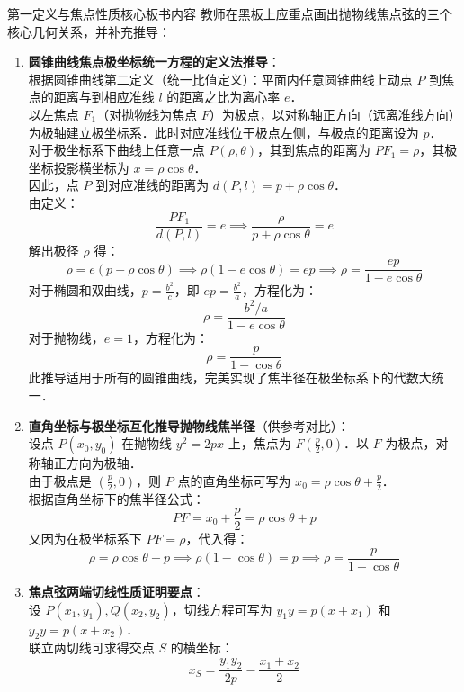 \documentclass[11pt,a4paper]{ctexart}
\begin{document}
\begin{teachbox}{第一定义与焦点性质核心板书内容}
教师在黑板上应重点画出抛物线焦点弦的三个核心几何关系，并补充推导：
\begin{enumerate}
  \item \textbf{圆锥曲线焦点极坐标统一方程的定义法推导}：\\
        根据圆锥曲线第二定义（统一比值定义）：平面内任意圆锥曲线上动点 $P$ 到焦点的距离与到相应准线 $l$ 的距离之比为离心率 $e$．\\
        以左焦点 $F_1$（对抛物线为焦点 $F$）为极点，以对称轴正方向（远离准线方向）为极轴建立极坐标系．此时对应准线位于极点左侧，与极点的距离设为 $p$．\\
        对于极坐标系下曲线上任意一点 $P(\rho, \theta)$，其到焦点的距离为 $PF_1 = \rho$，其极坐标投影横坐标为 $x = \rho\cos\theta$．\\
        因此，点 $P$ 到对应准线的距离为 $d(P,l) = p + \rho\cos\theta$．\\
        由定义：
        \[ \frac{PF_1}{d(P,l)} = e \implies \frac{\rho}{p + \rho\cos\theta} = e \]
        解出极径 $\rho$ 得：
        \[ \rho = e(p + \rho\cos\theta) \implies \rho(1 - e\cos\theta) = ep \implies \rho = \frac{ep}{1-e\cos\theta} \]
        对于椭圆和双曲线，$p = \frac{b^2}{c}$，即 $ep = \frac{b^2}{a}$，方程化为：
        \[ \rho = \frac{b^2/a}{1-e\cos\theta} \]
        对于抛物线，$e=1$，方程化为：
        \[ \rho = \frac{p}{1-\cos\theta} \]
        此推导适用于所有的圆锥曲线，完美实现了焦半径在极坐标系下的代数大统一．
  \item \textbf{直角坐标与极坐标互化推导抛物线焦半径}（供参考对比）：\\
        设点 $P(x_0,y_0)$ 在抛物线 $y^2=2px$ 上，焦点为 $F(\frac{p}{2},0)$．以 $F$ 为极点，对称轴正方向为极轴．\\
        由于极点是 $(\frac{p}{2},0)$，则 $P$ 点的直角坐标可写为 $x_0 = \rho\cos\theta + \frac{p}{2}$．\\
        根据直角坐标下的焦半径公式：
        \[ PF = x_0 + \frac{p}{2} = \rho\cos\theta + p \]
        又因为在极坐标系下 $PF = \rho$，代入得：
        \[ \rho = \rho\cos\theta + p \implies \rho(1-\cos\theta) = p \implies \rho = \frac{p}{1-\cos\theta} \]
  \item \textbf{焦点弦两端切线性质证明要点}：\\
        设 $P(x_1,y_1), Q(x_2,y_2)$，切线方程可写为 $y_1y = p(x+x_1)$ 和 $y_2y = p(x+x_2)$．\\
        联立两切线可求得交点 $S$ 的横坐标：
        \[ x_S = \frac{y_1y_2}{2p} - \frac{x_1+x_2}{2} \]

\end{enumerate}
\end{teachbox}
\end{document}
